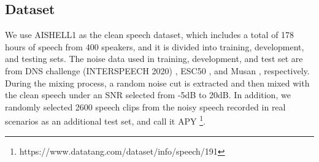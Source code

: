 \documentclass{article}
\begin{document}
	\subsection{Dataset}
	We use AISHELL1 \cite{aishell1} as the clean speech dataset, which includes a total of 178 hours of speech from 400 speakers, and it is divided into training, development, and testing sets. The noise data used in training, development, and test set are from DNS challenge (INTERSPEECH 2020) \cite{dns2020}, ESC50 \cite{esc50}, and  Musan \cite{musan}, respectively. During the mixing process, a random noise cut is extracted and then mixed with the clean speech under an SNR selected from -5dB to 20dB. In addition, we randomly selected 2600 speech clips from the noisy speech recorded in real scenarios as an additional test set, and call it APY \footnote{https://www.datatang.com/dataset/info/speech/191}.
%			
\end{document}
